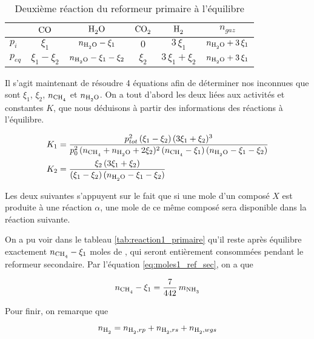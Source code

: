 \begin{table}
	\centering
	\begin{tabular}{l|c|c|c|c|c}
		 & $\ce{CO}$ & $\ce{H2O}$ & $\ce{CO2}$ & $\ce{H2}$ & $n_{gaz}$ \\
		\hline
		$p_{i}$ & $\xi_1$ & $n_{\ce{H2O}} - \xi_1$ & $0$ & $3 \, \xi_1$ &
		$n_{\ce{H2O}} + 3 \, \xi_1$ \\
		$p_{eq}$ & $\xi_1 - \xi_2$ & $n_{\ce{H2O}} - \xi_1 - \xi_2$ & 
		$\xi_2$ & $3 \, \xi_1 + \xi_2$ & $n_{\ce{H2O}} + 3 \, \xi_1 $\\
	\end{tabular}
	\caption{Deuxième réaction du reformeur primaire à l'équilibre}
	\label{tab:reaction2_primaire}
\end{table}

Il s'agit maintenant de résoudre 4 équations afin de déterminer nos inconnues que 
sont $\xi_1$, $\xi_2$, $n_{\ce{CH4}}$ et $n_{\ce{H2O}}$. 
On a tout d'abord les deux liées aux activités et constantes $K$, que nous déduisons
à partir des informations des réactions à l'équilibre.

\begin{align}
	K_1 &= \frac{p_{tot}^2 \, (\xi_1 - \xi_2) \, (3 \xi_1 + \xi_2)^3}
	{p_{0}^2 \, (n_{\ce{CH4}} + n_{\ce{H2O}} + 2 \xi_2)^2 \, (n_{\ce{CH4}} - 
	\xi_1) \, (n_{\ce{H2O}} - \xi_1 - \xi_2 )} 
	\label{eq:systeme1} \\
	K_2 &= \frac{\xi_2 \, (3 \xi_1 + \xi_2)}
	{(\xi_1 - \xi_2) \, (n_{\ce{H2O}} - \xi_1 - \xi_2)}
	\label{eq:systeme2}
\end{align}

Les deux suivantes s'appuyent sur le fait que si une mole d'un composé $X$ est
produite à une réaction $\alpha$, une mole de ce même composé sera disponible 
dans la réaction suivante.

On a pu voir dans le tableau \ref{tab:reaction1_primaire} qu'il reste après 
équilibre exactement $n_{\ce{CH4}} - \xi_1$ moles de , qui seront 
entièrement consommées pendant le reformeur secondaire. 
Par l'équation \ref{eq:moles1_ref_sec}, on a que 

\begin{equation}
	n_{\ce{CH4}} - \xi_1 = \frac{7}{442} \, m_{\ce{NH3}}
	\label{eq:systeme3}
\end{equation}

Pour finir, on remarque que 

\begin{equation*}
	n_{\ce{H2}} = n_{\ce{H2}, rp} + n_{\ce{H2}, rs} + n_{\ce{H2}, wgs}
\end{equation*}


